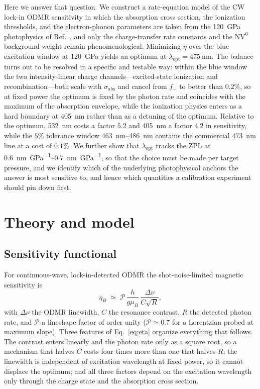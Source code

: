 \documentclass[preprint,12pt]{elsarticle}
\newcommand{\NVz}{\ensuremath{\mathrm{NV}^{0}}}
\newcommand{\sabs}{\ensuremath{\sigma_{\mathrm{abs}}}}
\newcommand{\fm}{\ensuremath{f_{-}}}
\newcommand{\lopt}{\ensuremath{\lambda_{\mathrm{opt}}}}
\begin{document}
Here we answer that question. We construct a rate-equation model of the CW lock-in
ODMR sensitivity in which the absorption cross section, the ionization thresholds,
and the electron-phonon parameters are taken from the \SI{120}{\giga\pascal}
photophysics of Ref.~\cite{Ho2026}, and only the charge-transfer rate constants
and the \NVz{} background weight remain phenomenological. Minimizing $\eta$ over
the blue excitation window at \SI{120}{\giga\pascal} yields an optimum at
$\lopt = \SI{475}{\nano\meter}$. The balance turns out to be resolved in a
specific and testable way: within the blue window the two intensity-linear charge
channels---excited-state ionization and recombination---both scale with $\sabs$
and cancel from $\fm$ to better than $0.2\%$, so at fixed power the optimum is
fixed by the photon rate and coincides with the maximum of the absorption
envelope, while the ionization physics enters as a hard boundary at
\SI{405}{\nano\meter} rather than as a detuning of the optimum. Relative to the
optimum, \SI{532}{\nano\meter} costs a factor $5.2$ and \SI{405}{\nano\meter} a
factor $4.2$ in sensitivity, while the $5\%$ tolerance window
\SIrange{463}{486}{\nano\meter} contains the commercial \SI{473}{\nano\meter}
line at a cost of $0.1\%$. We further show that $\lopt$ tracks the ZPL at
\SIrange{0.6}{0.7}{\nano\meter\per\giga\pascal}, so that the choice must be made
per target pressure, and we identify which of the underlying photophysical
anchors the answer is most sensitive to, and hence which quantities a calibration
experiment should pin down first.

\section{Theory and model}
\label{sec:model}

\subsection{Sensitivity functional}
\label{sec:model:eta}

For continuous-wave, lock-in-detected ODMR the shot-noise-limited magnetic
sensitivity is~\cite{Barry2020,Dreau2011,Rondin2014}
\begin{equation}
  \eta_B \;\simeq\; \mathcal{P}\,\frac{h}{g\mu_B}\,
  \frac{\Delta\nu}{C\sqrt{R}} ,
  \label{eq:eta}
\end{equation}
with $\Delta\nu$ the ODMR linewidth, $C$ the resonance contrast, $R$ the detected
photon rate, and $\mathcal{P}$ a lineshape factor of order unity ($\mathcal{P}
\simeq 0.7$ for a Lorentzian probed at maximum slope). Three features of
Eq.~\eqref{eq:eta} organize everything that follows. The contrast enters
linearly and the photon rate only as a square root, so a mechanism that halves
$C$ costs four times more than one that halves $R$; the linewidth is independent
of excitation wavelength at fixed power, so it cannot displace the optimum; and
all three factors depend on the excitation wavelength only through the charge
state and the absorption cross section.
\end{document}
